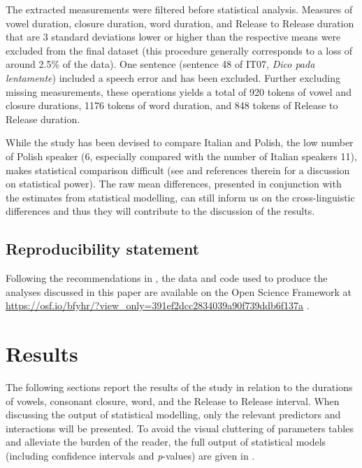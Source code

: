 \documentclass[12pt,]{article}
\begin{document}
The extracted measurements were filtered before statistical analysis.
Measures of vowel duration, closure duration, word duration, and Release
to Release duration that are 3 standard deviations lower or higher than
the respective means were excluded from the final dataset (this
procedure generally corresponds to a loss of around 2.5\% of the data).
One sentence (sentence 48 of IT07, \emph{Dico pada lentamente}) included
a speech error and has been excluded. Further excluding missing
measurements, these operations yields a total of 920 tokens of vowel and
closure durations, 1176 tokens of word duration, and 848 tokens of
Release to Release duration.

While the study has been devised to compare Italian and Polish, the low
number of Polish speaker (6, especially compared with the number of
Italian speakers 11), makes statistical comparison difficult (see
\citealt{kirby2018} and references therein for a discussion on
statistical power). The raw mean differences, presented in conjunction
with the estimates from statistical modelling, can still inform us on
the cross-linguistic differences and thus they will contribute to the
discussion of the results.

\hypertarget{reproducibility-statement}{%
\subsection{Reproducibility statement}\label{reproducibility-statement}}

Following the recommendations in \citet{berez-kroeker2018}, the data and
code used to produce the analyses discussed in this paper are available
on the Open Science Framework at
\url{https://osf.io/bfyhr/?view_only=391ef2dcc2834039a90f739ddb6f137a}
\citep{coretta2018g}.

\hypertarget{results}{%
\section{Results}\label{results}}

The following sections report the results of the study in relation to
the durations of vowels, consonant closure, word, and the Release to
Release interval. When discussing the output of statistical modelling,
only the relevant predictors and interactions will be presented. To
avoid the visual cluttering of parameters tables and alleviate the
burden of the reader, the full output of statistical models (including
confidence intervals and \emph{p}-values) are given in .
\end{document}
